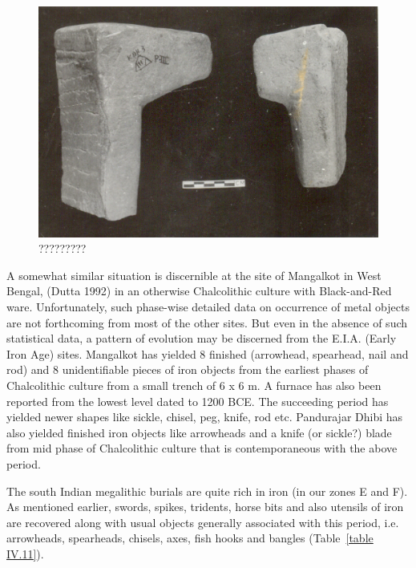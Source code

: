\begin{figure}[H]
\renewcommand{\thefigure}{16C}
\includegraphics[scale=0.75]{images/chapter-4/fig016C.jpg}
\caption{?????????}\label{chapter-4-fig16C}
\end{figure}
\vspace{-.5cm}

A somewhat similar situation is discernible at the site of Mangalkot in West Bengal, (Dutta 1992) in an otherwise Chalcolithic culture with Black-and-Red ware. Unfortunately, such phase-wise detailed data on occurrence of metal objects are not forthcoming from most of the other sites. But even in the absence of such statistical data, a pattern of evolution may be discerned from the E.I.A. (Early Iron Age) sites. Mangalkot has yielded 8 finished (arrowhead, spearhead, nail and rod) and 8 unidentifiable pieces of iron objects from the earliest phases of Chalcolithic culture from a small trench of 6 x 6 m. A furnace has also been reported from the lowest level dated to 1200 BCE. The succeeding period has yielded newer shapes like sickle, chisel, peg, knife, rod etc. Pandurajar Dhibi has also yielded finished iron objects like arrowheads and a knife (or sickle?) blade from mid phase of Chalcolithic culture that is contemporaneous with the above period.

The south Indian megalithic burials are quite rich in iron (in our zones E and F). As mentioned earlier, swords, spikes, tridents, horse bits and also utensils of iron are recovered along with usual objects generally associated with this period, i.e. arrowheads, spearheads, chisels, axes, fish hooks and bangles (Table~\ref{table IV.11}).

